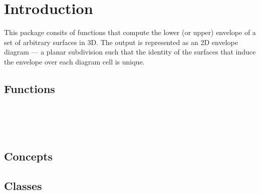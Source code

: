 \label{chapterEnvelope_3_ref}
{}

\section*{Introduction}
\label{env3_ref_sec:intro}

This package consits of functions that compute the lower (or upper)
envelope of a set of arbitrary surfaces in 3D. The output is
represented as an 2D envelope diagram --- a planar subdivision such
that the identity of the surfaces that induce the envelope over each
diagram cell is unique.

\subsection*{Functions}

\\
\\
\\

\subsection*{Concepts}


\subsection*{Classes}

\\
\\
\\
\\
\\



